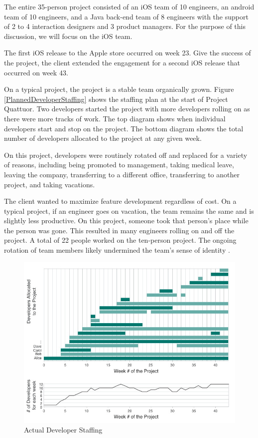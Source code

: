 The entire 35-person project consisted of an iOS team of 10 engineers, an android team of 10 engineers, and a Java back-end team of 8 engineers with the support of 2 to 4 interaction designers and 3 product managers. For the purpose of this discussion, we will focus on the iOS team. 

The first iOS release to the Apple store occurred on week 23. Give the success of the project, the client extended the engagement for a second iOS release that occurred on week 43. 

On a typical project, the project is a stable team organically grown. Figure \ref{PlannedDeveloperStaffing} shows the staffing plan at the start of Project Quattuor. Two developers started the project with more developers rolling on as there were more tracks of work. The top diagram shows when individual developers start and stop on the project. The bottom diagram shows the total number of developers allocated to the project at any given week. 

On this project, developers were routinely rotated off and replaced for a variety of reasons, including being promoted to management, taking medical leave, leaving the company, transferring to a different office, transferring to another project, and taking vacations. 

The client wanted to maximize feature development regardless of cost. On a typical project, if an engineer goes on vacation, the team remains the same and is slightly less productive. On this project, someone took that person's place while the person was gone. This resulted in many engineers rolling on and off the project. A total of 22 people worked on the ten-person project. The ongoing rotation of team members likely undermined the team's sense of identity \cite{TuckmanModel}.

\begin{figure}[t]
\centering
\includegraphics[width=7.1in]{DeveloperStaffing.jpg}
\caption{Actual Developer Staffing}
\label{DeveloperStaffing}
\end{figure}

